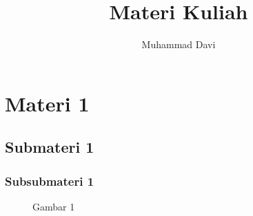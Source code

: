 \documentclass[12pt,a4paper]{article}
\begin{document}
\title{Materi Kuliah}
\author{Muhammad Davi}
\maketitle

\section{Materi 1}
\subsection{Submateri 1}
\subsubsection{Subsubmateri 1}
\begin{figure}[h]
\centering
\caption{Gambar 1}
\end{figure}
\end{document}
